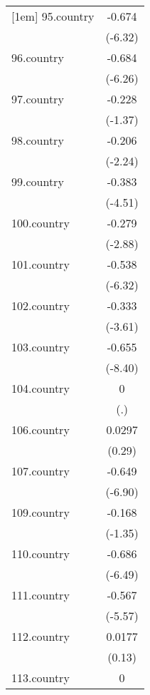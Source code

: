 {\begin{tabular}{l*{1}{c}}
[1em]
95.country  &      -0.674\sym{***}\\
            &     (-6.32)         \\
[1em]
96.country  &      -0.684\sym{***}\\
            &     (-6.26)         \\
[1em]
97.country  &      -0.228         \\
            &     (-1.37)         \\
[1em]
98.country  &      -0.206\sym{*}  \\
            &     (-2.24)         \\
[1em]
99.country  &      -0.383\sym{***}\\
            &     (-4.51)         \\
[1em]
100.country &      -0.279\sym{**} \\
            &     (-2.88)         \\
[1em]
101.country &      -0.538\sym{***}\\
            &     (-6.32)         \\
[1em]
102.country &      -0.333\sym{***}\\
            &     (-3.61)         \\
[1em]
103.country &      -0.655\sym{***}\\
            &     (-8.40)         \\
[1em]
104.country &           0         \\
            &         (.)         \\
[1em]
106.country &      0.0297         \\
            &      (0.29)         \\
[1em]
107.country &      -0.649\sym{***}\\
            &     (-6.90)         \\
[1em]
109.country &      -0.168         \\
            &     (-1.35)         \\
[1em]
110.country &      -0.686\sym{***}\\
            &     (-6.49)         \\
[1em]
111.country &      -0.567\sym{***}\\
            &     (-5.57)         \\
[1em]
112.country &      0.0177         \\
            &      (0.13)         \\
[1em]
113.country &           0         \\

\end{tabular}}
